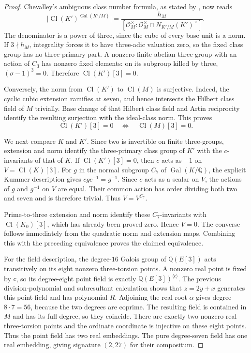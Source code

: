 \begin{proof}
Chevalley's ambiguous class number formula, as stated
by \citet[Theorem~1, author p.~1]{Lemmermeyer2013}, now reads
\[
 \bigl|\operatorname{Cl}(K')^{\operatorname{Gal}(K'/M)}\bigr|
 =\frac{h_M}{
 [\mathcal O_M^\times:
  \mathcal O_M^\times\cap N_{K'/M}(K')^\times]}.
\]
The denominator is a power of three, since the cube of every base
unit is a norm. If $3\nmid h_M$,
integrality forces it to have three-adic valuation zero,
so the fixed class group has no three-primary part.
A nonzero finite abelian three-group with an action of
$C_3$ has nonzero fixed elements: on its subgroup
killed by three, $(\sigma-1)^3=0$.  Therefore
$\operatorname{Cl}(K')[3]=0$.

Conversely, the norm from $\operatorname{Cl}(K')$ to
$\operatorname{Cl}(M)$ is surjective.  Indeed, the
cyclic cubic extension ramifies at seven, and hence
intersects the Hilbert class field of $M$ trivially.
Base change of that Hilbert class field and Artin
reciprocity identify the resulting surjection with
the ideal-class norm.  This proves
\[
 \operatorname{Cl}(K')[3]=0
 \quad\Longleftrightarrow\quad
 \operatorname{Cl}(M)[3]=0.
\]

We next compare $K$ and $K'$.  Since two is invertible
on finite three-groups, extension and norm identify
the three-primary class group of $K'$ with the
$c$-invariants of that of $K$.
If $\operatorname{Cl}(K')[3]=0$, then $c$ acts as
$-1$ on $V=\operatorname{Cl}(K)[3]$.
For $g$ in the normal subgroup $C_7$ of
$\operatorname{Gal}(K/\mathbb Q)$, the explicit Kummer
description gives $cgc^{-1}=g^{-1}$.  Since $c$
acts as a scalar on $V$, the actions of $g$ and
$g^{-1}$ on $V$ are equal.  Their common action has
order dividing both two and seven and is therefore
trivial.  Thus $V=V^{C_7}$.

Prime-to-three extension and norm identify these
$C_7$-invariants with $\operatorname{Cl}(K_0)[3]$,
which has already been proved zero.  Hence $V=0$.
The converse follows immediately from the quadratic
norm and extension maps.  Combining this with the preceding equivalence
proves the claimed equivalence.

For the field description, the degree-$16$ Galois
group of $\mathbb Q(E[3])$ acts transitively on its
eight nonzero three-torsion points.  A nonzero real
point is fixed by $c$, so its degree-eight point
field is exactly $\mathbb Q(E[3])^{\langle c\rangle}$.
The previous division-polynomial and subresultant
calculation shows that $z=2y+x$ generates this point
field and has polynomial $R$.
Adjoining the real root $\alpha$ gives degree
$8\cdot7=56$, because the two degrees are coprime.
The resulting field is contained in $M$ and has
its full degree, so they coincide.
There are exactly two nonzero real three-torsion
points and the ordinate coordinate is injective
on these eight points.  Thus the point field has
two real embeddings.  The pure degree-seven field
has one real embedding, giving signature $(2,27)$
for their compositum.


\end{proof}
